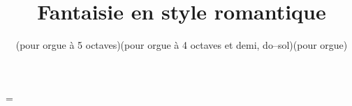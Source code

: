 \ifx\ftranspose\undefined{}\fi
\ifx\fsignature\undefined{}\fi

\ifx\mxversion\undefined
  
  
  
\fi


\title{Fantaisie en style romantique}
\transpose=\ftranspose\relax
\newif\iffiveoctaves
\ifnum{}\relax
     \subtitle{(pour orgue \`a 5 octaves)}
     \fiveoctavestrue
  \else\ifnum{}\relax
        \subtitle{(pour orgue \`a 4 octaves et demi, do--sol)}
        \fiveoctavesfalse
     \else
        \subtitle{(pour orgue)}
        \fiveoctavesfalse
     \fi
\fi 

\maketitle

\ifx\ftranspose\undefined{}\fi
\ifx\fsignature\undefined{}\fi

